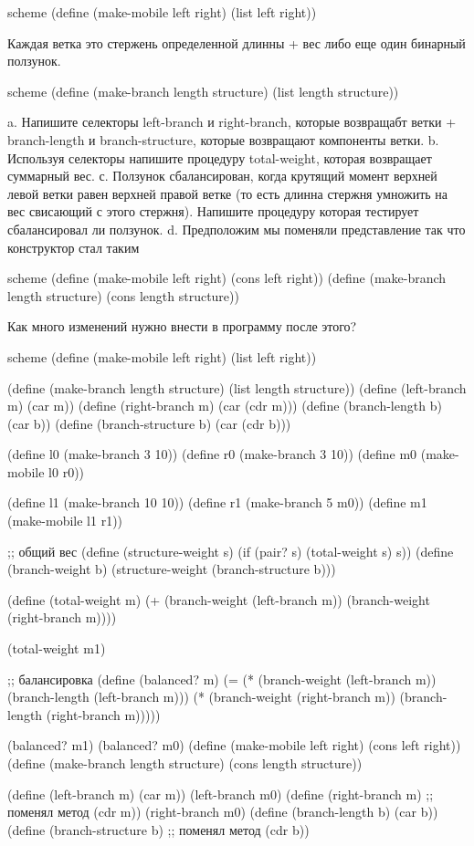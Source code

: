 \begin{codelisting}{scheme}
(define (make-mobile left right)
  (list left right))
\end{codelisting}

 Каждая ветка это стержень определенной длинны + вес либо еще один бинарный ползунок.

\begin{codelisting}{scheme}
(define (make-branch length structure)
  (list length structure))
\end{codelisting}

a. Напишите селекторы left-branch и right-branch, которые возвращабт ветки + branch-length и branch-structure, которые возвращают компоненты ветки.
b. Используя селекторы напишите процедуру total-weight, которая возвращает суммарный вес.
с. Ползунок сбалансирован, когда крутящий момент верхней левой ветки равен верхней правой ветке (то есть длинна стержня умножить на вес свисающий с этого стержня). Напишите процедуру которая тестирует сбалансировал ли ползунок.
d. Предположим мы поменяли представление так что конструктор стал таким

\begin{codelisting}{scheme}
(define (make-mobile left right)
  (cons left right))
(define (make-branch length structure)
  (cons length structure))
\end{codelisting}

Как много изменений нужно внести в программу после этого?

\begin{codelisting}{scheme}
(define (make-mobile left right)
  (list left right))

(define (make-branch length structure)
  (list length structure))
(define (left-branch m)
  (car m))
(define (right-branch m)
  (car (cdr m)))
(define (branch-length b)
  (car b))
(define (branch-structure b)
  (car (cdr b)))


(define l0 (make-branch 3 10))
(define r0 (make-branch 3 10))
(define m0 (make-mobile l0 r0))

(define l1 (make-branch 10 10))
(define r1 (make-branch 5 m0))
(define m1 (make-mobile l1 r1))

;; общий вес
(define (structure-weight s)
  (if (pair? s)
      (total-weight s)
      s))
(define (branch-weight b)
  (structure-weight (branch-structure b)))

(define (total-weight m)
  (+ (branch-weight (left-branch m)) (branch-weight (right-branch m))))

(total-weight m1)

;; балансировка
(define (balanced? m)
  (= (* (branch-weight (left-branch m)) (branch-length (left-branch m)))
     (* (branch-weight (right-branch m)) (branch-length (right-branch m)))))

(balanced? m1)
(balanced? m0)
(define (make-mobile left right)
  (cons left right))
(define (make-branch length structure)
  (cons length structure))

(define (left-branch m)
  (car m))
(left-branch m0)
(define (right-branch m) ;; поменял метод
  (cdr m))
(right-branch m0)
(define (branch-length b)
  (car b))
(define (branch-structure b) ;; поменял метод
  (cdr b))
\end{codelisting}

